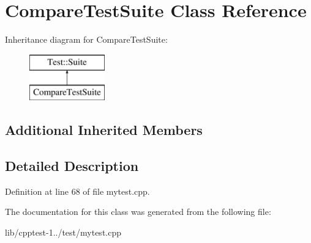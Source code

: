 \hypertarget{class_compare_test_suite}{}\section{Compare\+Test\+Suite Class Reference}
\label{class_compare_test_suite}
Inheritance diagram for Compare\+Test\+Suite\+:\begin{figure}[H]
\begin{center}
\leavevmode
\includegraphics[height=2.000000cm]{class_compare_test_suite}
\end{center}
\end{figure}
\subsection*{Additional Inherited Members}


\subsection{Detailed Description}


Definition at line 68 of file mytest.\+cpp.



The documentation for this class was generated from the following file\+:\begin{DoxyCompactItemize}
\item 
lib/cpptest-\/1../test/mytest.\+cpp\end{DoxyCompactItemize}
